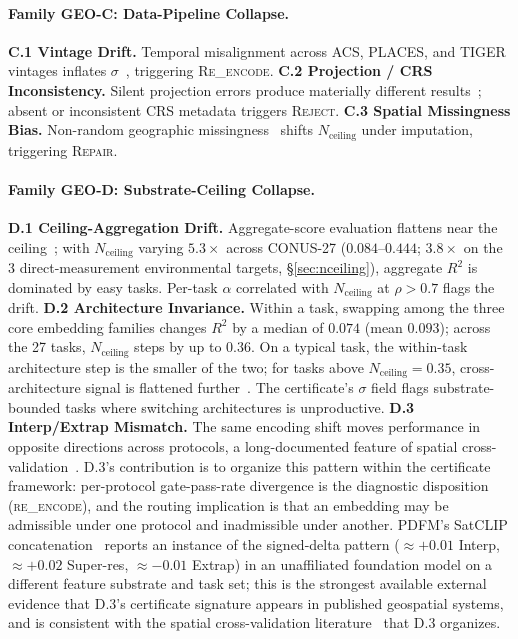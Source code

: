 \documentclass{article}
\begin{document}
\paragraph{Family GEO-C: Data-Pipeline Collapse.}
\textbf{C.1 Vintage Drift.} Temporal misalignment across ACS, PLACES, and TIGER vintages inflates $\sigma$~\citep{kwon2023acs}, triggering \textsc{Re\_encode}.
\textbf{C.2 Projection / CRS Inconsistency.} Silent projection errors produce materially different results~\citep{cao2017projection}; absent or inconsistent CRS metadata triggers \textsc{Reject}.
\textbf{C.3 Spatial Missingness Bias.} Non-random geographic missingness~\citep{rubin1976missing,oliver2005cartographic} shifts $N_{\text{ceiling}}$ under imputation, triggering \textsc{Repair}.

\paragraph{Family GEO-D: Substrate-Ceiling Collapse.}
\textbf{D.1 Ceiling-Aggregation Drift.} Aggregate-score evaluation flattens near the ceiling~\citep{ott2022saturation,kiela2021dynabench}; with $N_{\text{ceiling}}$ varying $5.3{\times}$ across CONUS-27 ($0.084$--$0.444$; $3.8{\times}$ on the 3 direct-measurement environmental targets, \S\ref{sec:nceiling}), aggregate $R^2$ is dominated by easy tasks. Per-task $\alpha$ correlated with $N_{\text{ceiling}}$ at $\rho > 0.7$ flags the drift.
\textbf{D.2 Architecture Invariance.} Within a task, swapping among the three core embedding families changes $R^2$ by a median of $0.074$ (mean $0.093$); across the 27 tasks, $N_{\text{ceiling}}$ steps by up to $0.36$. On a typical task, the within-task architecture step is the smaller of the two; for tasks above $N_{\text{ceiling}} = 0.35$, cross-architecture signal is flattened further~\citep{ott2022saturation}. The certificate's $\sigma$ field flags substrate-bounded tasks where switching architectures is unproductive.
\textbf{D.3 Interp/Extrap Mismatch.} The same encoding shift moves performance in opposite directions across protocols, a long-documented feature of spatial cross-validation~\citep{roberts2017cv,ploton2020spatial,mila2022nndm}. D.3's contribution is to organize this pattern within the certificate framework: per-protocol gate-pass-rate divergence is the diagnostic disposition (\textsc{re\_encode}), and the routing implication is that an embedding may be admissible under one protocol and inadmissible under another. PDFM's SatCLIP concatenation~\citep[Table~4]{agarwal2025pdfm} reports an instance of the signed-delta pattern (${\approx}{+}0.01$ Interp, ${\approx}{+}0.02$ Super-res, ${\approx}{-}0.01$ Extrap) in an unaffiliated foundation model on a different feature substrate and task set; this is the strongest available external evidence that D.3's certificate signature appears in published geospatial systems, and is consistent with the spatial cross-validation literature~\citep{roberts2017cv,ploton2020spatial,mila2022nndm} that D.3 organizes.
\end{document}
